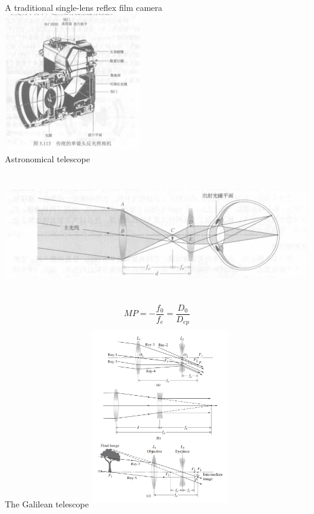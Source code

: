 \documentclass[fleqn,leqno]{article}
\begin{document}
		A traditional single-lens reflex film camera\\
		\includegraphics[width=6cm,height=6cm]{camera.png}\\
		Astronomical telescope\\
		\includegraphics[width=16cm,height=6cm]{telescope.png}
		\begin{equation}
			MP=-\frac{f_{0}}{f_{e}}=\frac{D_{0}}{D_{ep}}
		\end{equation}
		The Galilean telescope
		\includegraphics[width=6cm,height=8cm]{Galilean.png}
\end{document}
